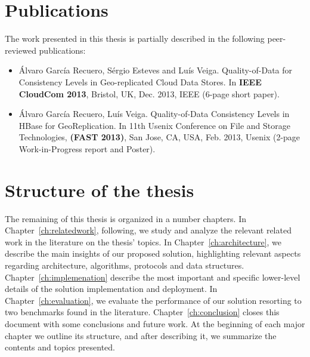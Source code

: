 \section{Publications}

The work presented in this thesis is partially described in the following peer-reviewed publications:
\begin{itemize}
\item  \'{A}lvaro Garc\'{i}a Recuero, S\'{e}rgio Esteves and Lu\'{i}s Veiga. Quality-of-Data for Consistency Levels in Geo-replicated Cloud Data Stores. In {\bf
     IEEE CloudCom 2013}, Bristol, UK, Dec. 2013, IEEE (6-page short paper).


\item \'{A}lvaro Garc\'{i}a Recuero, Lu\'{i}s Veiga. Quality-of-Data Consistency Levels in HBase for GeoReplication. In 11th Usenix Conference on File and Storage Technologies, {\bf (FAST 2013)}, San Jose, CA, USA, Feb. 2013, Usenix (2-page Work-in-Progress report and Poster).
\end{itemize}




\section{Structure of the thesis}

The remaining of this thesis is organized in a number chapters.
%
%
In Chapter~\ref{ch:relatedwork}, following, we study and analyze the relevant related work in the literature on the thesis' topics. In Chapter~\ref{ch:architecture}, we describe the main insights of our proposed solution, highlighting relevant aspects regarding architecture, algorithms, protocols and data structures. Chapter~\ref{ch:implemenation} describe the most important and specific lower-level details of the solution implementation and deployment. In Chapter~\ref{ch:evaluation}, we evaluate the performance of our solution resorting to two benchmarks found in the literature. Chapter~\ref{ch:conclusion} closes this document with some conclusions and future work.
%
At the beginning of each major chapter we outline its structure, and after describing it, we summarize the contents and topics presented.
%



